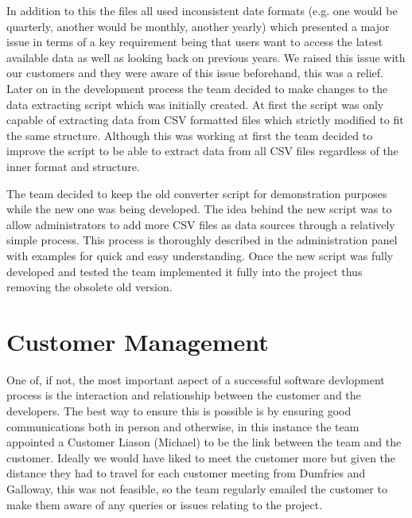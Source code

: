 \documentclass{l3proj}
\begin{document}
In addition to this the files all used inconsistent date formats (e.g. one would be quarterly, another would be monthly,
another yearly) which presented a major issue in terms of a key requirement being that users want to access the latest
available data as well as looking back on previous years. We raised this issue with our customers and they were aware of
this issue beforehand, this was a relief. Later on in the development process the team decided to make changes to the
data extracting script which was initially created. At first the script was only capable of extracting data from CSV
formatted files which strictly modified to fit the same structure. Although this was working at first the team decided
to improve the script to be able to extract data from all CSV files regardless of the inner format and structure.

The team decided to keep the old converter script for demonstration purposes while the new one was being developed.
The idea behind the new script was to allow administrators to add more CSV files as data sources through a relatively
simple process. This process is thoroughly described in the administration panel with examples for quick and easy
understanding. Once the new script was fully developed and tested the team implemented it fully into the project thus
removing the obsolete old version.



\section{Customer Management}
\label{sec:customer-management}


One of, if not, the most important aspect of a successful software devlopment process is the interaction and relationship
between the customer and the developers. The best way to ensure this is possible is by ensuring good communications
both in person and otherwise, in this instance the team appointed a Customer Liason (Michael) to be the link between the
team and the customer. Ideally we would have liked to meet the customer more but given the distance they had to travel
for each customer meeting from Dumfries and Galloway, this was not feasible, so the team regularly emailed the customer
to make them aware of any queries or issues relating to the project.
\end{document}
